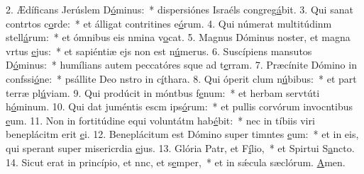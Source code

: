 2. Ædíficans Jerúslem D\uline{ó}minus:~* dispersiónes Israéls congreg\uline{á}bit.
3. Qui sanat contrtos c\uline{o}rde:~* et álligat contritines e\uline{ó}rum.
4. Qui númerat multitúdinm stell\uline{á}rum:~* et ómnibus eis nmina v\uline{o}cat.
5. Magnus Dóminus noster, et magna vrtus \uline{e}jus:~* et sapiéntiæ ejs non est n\uline{ú}merus.
6. Suscípiens mansutos D\uline{ó}minus:~* humílians autem peccatóres sque ad t\uline{e}rram.
7. Præcínite Dómino in confssi\uline{ó}ne:~* psállite Deo nstro in c\uline{í}thara.
8. Qui óperit clum n\uline{ú}bibus:~* et part terræ pl\uline{ú}viam.
9. Qui prodúcit in móntbus f\uline{e}num:~* et herbam servtúti h\uline{ó}minum.
10. Qui dat juméntis escm ips\uline{ó}rum:~* et pullis corvórum invocntibus \uline{e}um.
11. Non in fortitúdine equi voluntátm hab\uline{é}bit:~* nec in tíbiis viri beneplácitm erit \uline{e}i.
12. Beneplácitum est Dómino super timntes \uline{e}um:~* et in eis, qui sperant super misericrdia \uline{e}jus.
13. Glória Patr, et F\uline{í}lio,~* et Spirtui S\uline{a}ncto.
14. Sicut erat in princípio, et nnc, et s\uline{e}mper,~* et in sǽcula sæclórum. \uline{A}men.
